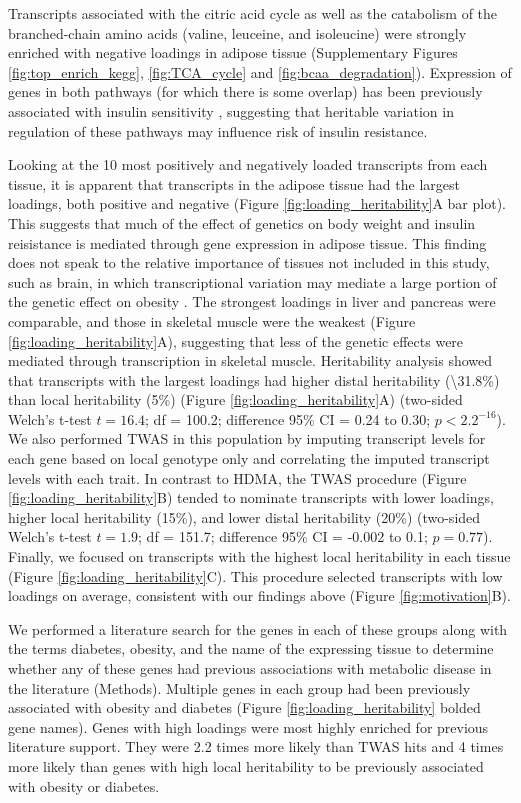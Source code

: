 \documentclass[
]{article}
\begin{document}
Transcripts associated with the citric acid cycle as well as the
catabolism of the branched-chain amino acids (valine, leuceine, and
isoleucine) were strongly enriched with negative loadings in adipose
tissue (Supplementary Figures \ref{fig:top_enrich_kegg},
\ref{fig:TCA_cycle} and \ref{fig:bcaa_degradation}). Expression of genes
in both pathways (for which there is some overlap) has been previously
associated with insulin sensitivity \cite{pmid29567659, 
pmid22560213, pmid19841271}, suggesting that heritable variation in
regulation of these pathways may influence risk of insulin resistance.

Looking at the 10 most positively and negatively loaded transcripts from
each tissue, it is apparent that transcripts in the adipose tissue had
the largest loadings, both positive and negative (Figure
\ref{fig:loading_heritability}A bar plot). This suggests that much of
the effect of genetics on body weight and insulin reisistance is
mediated through gene expression in adipose tissue. This finding does
not speak to the relative importance of tissues not included in this
study, such as brain, in which transcriptional variation may mediate a
large portion of the genetic effect on obesity \cite{pmid18721800}. The
strongest loadings in liver and pancreas were comparable, and those in
skeletal muscle were the weakest (Figure
\ref{fig:loading_heritability}A), suggesting that less of the genetic
effects were mediated through transcription in skeletal muscle.
Heritability analysis showed that transcripts with the largest loadings
had higher distal heritability (\textbackslash31.8\%) than local
heritability (5\%) (Figure \ref{fig:loading_heritability}A) (two-sided
Welch's t-test \(t = 16.4\); df = 100.2; difference 95\% CI = 0.24 to
0.30; \(p < 2.2^{-16}\)). We also performed TWAS in this population by
imputing transcript levels for each gene based on local genotype only
and correlating the imputed transcript levels with each trait. In
contrast to HDMA, the TWAS procedure (Figure
\ref{fig:loading_heritability}B) tended to nominate transcripts with
lower loadings, higher local heritability (15\%), and lower distal
heritability (20\%) (two-sided Welch's t-test \(t = 1.9\); df = 151.7;
difference 95\% CI = -0.002 to 0.1; \(p = 0.77\)). Finally, we focused
on transcripts with the highest local heritability in each tissue
(Figure \ref{fig:loading_heritability}C). This procedure selected
transcripts with low loadings on average, consistent with our findings
above (Figure \ref{fig:motivation}B).

We performed a literature search for the genes in each of these groups
along with the terms diabetes, obesity, and the name of the expressing
tissue to determine whether any of these genes had previous associations
with metabolic disease in the literature (Methods). Multiple genes in
each group had been previously associated with obesity and diabetes
(Figure \ref{fig:loading_heritability} bolded gene names). Genes with
high loadings were most highly enriched for previous literature support.
They were 2.2 times more likely than TWAS hits and 4 times more likely
than genes with high local heritability to be previously associated with
obesity or diabetes.
\end{document}
